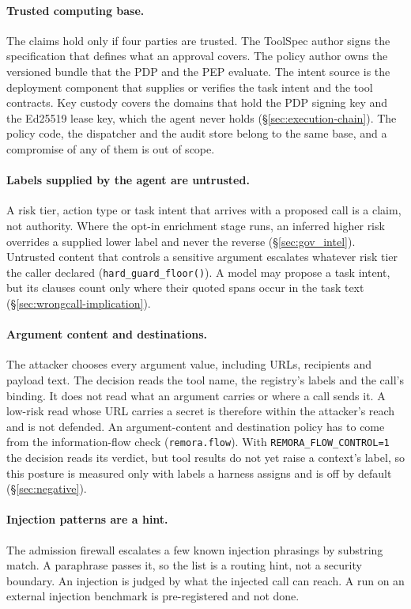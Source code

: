 \documentclass[10pt,twocolumn]{article}
\begin{document}
\paragraph{Trusted computing base.} The claims hold only if four parties
are trusted. The ToolSpec author signs the specification that defines what
an approval covers. The policy author owns the versioned bundle that the
PDP and the PEP evaluate. The intent source is the deployment component
that supplies or verifies the task intent and the tool contracts. Key
custody covers the domains that hold the PDP signing key and the Ed25519
lease key, which the agent never holds (\S\ref{sec:execution-chain}). The
policy code, the dispatcher and the audit store belong to the same base,
and a compromise of any of them is out of scope.

\paragraph{Labels supplied by the agent are untrusted.} A risk tier,
action type or task intent that arrives with a proposed call is a claim,
not authority. Where the opt-in enrichment stage runs, an inferred higher
risk overrides a supplied lower label and never the reverse
(\S\ref{sec:gov_intel}). Untrusted content that controls a sensitive argument
escalates whatever risk tier the caller declared
(\texttt{hard\_guard\_floor()}). A model may propose a task intent, but
its clauses count only where their quoted spans occur in the task text
(\S\ref{sec:wrongcall-implication}).

\paragraph{Argument content and destinations.} The attacker chooses every
argument value, including URLs, recipients and payload text. The decision
reads the tool name, the registry's labels and the call's binding. It does
not read what an argument carries or where a call sends it. A low-risk read
whose URL carries a secret is therefore within the attacker's reach and is
not defended. An argument-content and destination policy has to come from
the information-flow check (\texttt{remora.flow}). With
\texttt{REMORA\_FLOW\_CONTROL=1} the decision reads its verdict, but tool
results do not yet raise a context's label, so this posture is measured
only with labels a harness assigns and is off by default
(\S\ref{sec:negative}).

\paragraph{Injection patterns are a hint.} The admission firewall escalates
a few known injection phrasings by substring match. A paraphrase passes it,
so the list is a routing hint, not a security boundary. An injection is
judged by what the injected call can reach. A run on an external injection
benchmark is pre-registered and not done.
\end{document}
